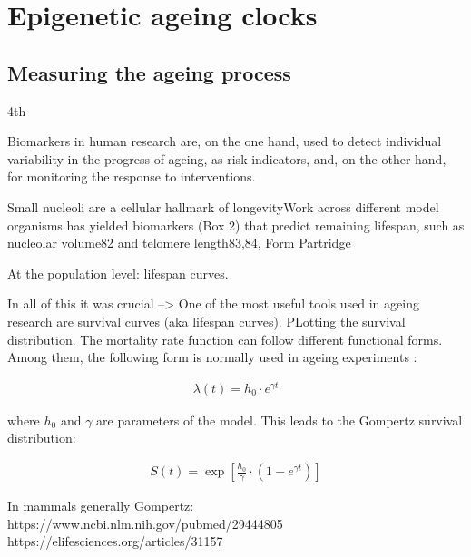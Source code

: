 \section{Epigenetic ageing clocks}

\subsection{Measuring the ageing process}

4th

Biomarkers in human research are, on the one hand, used to detect individual variability in the progress of ageing, as risk indicators, and, on the other hand, for monitoring the response to interventions. 

Small nucleoli are a cellular hallmark of longevityWork across different model organisms has yielded biomarkers (Box 2) that predict remaining lifespan, such as nucleolar volume82 and telomere length83,84, Form Partridge

At the population level: lifespan curves. 

In all of this it was crucial --> One of the most useful tools used in ageing research are survival curves (aka lifespan curves). PLotting the survival distribution. The mortality rate function can follow different functional forms. Among them, the following form is normally used in ageing experiments \cite{Witten1986}:

\begin{align}
\lambda(t) = h_0 \cdot e^{\gamma t}
\end{align}

where $h_0$ and $\gamma$ are parameters of the model. This leads to the Gompertz survival distribution:

\begin{align}
S(t) = \exp \left[ \frac{h_0}{\gamma} \cdot (1-e^{\gamma t}) \right]
\end{align}



In mammals generally Gompertz:
https://www.ncbi.nlm.nih.gov/pubmed/29444805
https://elifesciences.org/articles/31157 

